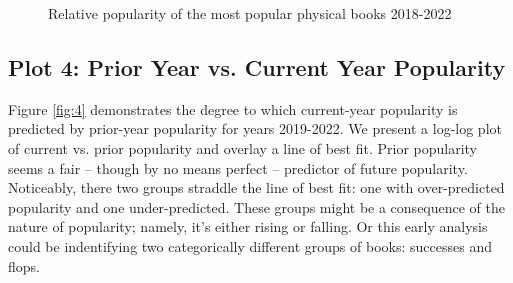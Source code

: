 \documentclass[10pt]{article}\usepackage[]{graphicx}\usepackage[]{xcolor}
\makeatletter
\newenvironment{kframe}{%
 \def\at@end@of@kframe{}%
 \ifinner\ifhmode%
  \def\at@end@of@kframe{\end{minipage}}%
  \begin{minipage}{\columnwidth}%
 \fi\fi%
 \def\FrameCommand##1{\hskip\@totalleftmargin \hskip-\fboxsep
 \colorbox{shadecolor}{##1}\hskip-\fboxsep
     \hskip-\linewidth \hskip-\@totalleftmargin \hskip\columnwidth}%
 \MakeFramed {\advance\hsize-\width
   \@totalleftmargin\z@ \linewidth\hsize
   \@setminipage}}%
 {\par\unskip\endMakeFramed%
 \at@end@of@kframe}
\newenvironment{knitrout}{}{} %
\makeatother
\begin{document}
\begin{figure}[H]
\begin{center}
\begin{knitrout}
\color{fgcolor}\begin{kframe}


{\ttfamily\noindent\bfseries{}}

{\ttfamily\noindent\bfseries\color{errorcolor}{\#\# Error in eval(expr, envir, enclos): object 'book\_positions\_by\_year' not found}}

{\ttfamily\noindent\bfseries{}}

{\ttfamily\noindent\bfseries{}}

{\ttfamily\noindent\bfseries\color{errorcolor}{\#\# Error in eval(expr, envir, enclos): object 'titles' not found}}\end{kframe}
\end{knitrout}
\end{center}
\caption{Relative popularity of the most popular physical books 2018-2022}\label{fig:3}
\end{figure}

\subsection{Plot 4: Prior Year vs. Current Year Popularity}

Figure \ref{fig:4} demonstrates the degree to which current-year popularity is predicted by prior-year popularity for years 2019-2022. We present a log-log plot of current vs. prior popularity and overlay a line of best fit. Prior popularity seems a fair -- though by no means perfect -- predictor of future popularity. Noticeably, there two groups straddle the line of best fit: one with over-predicted popularity and one under-predicted. These groups might be a consequence of the nature of popularity; namely, it's either rising or falling. Or this early analysis could be indentifying two categorically different groups of books: successes and flops. 
\end{document}
